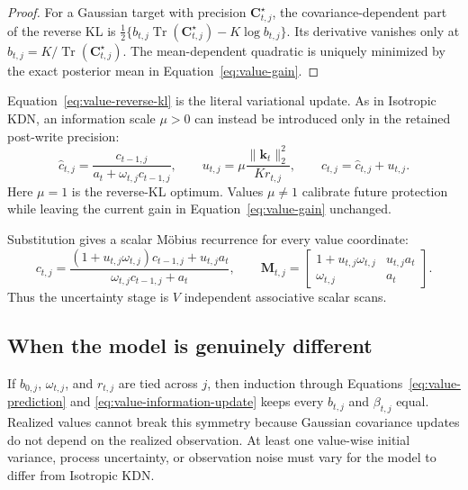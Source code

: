 \documentclass[11pt]{article}
\newcommand{\ve}[1]{\boldsymbol{#1}}
\newcommand{\Tr}{\operatorname{Tr}}
\begin{document}
\begin{proof}
For a Gaussian target with precision $\ve{C}_{t,j}^{\star}$, the covariance-dependent part of
the reverse KL is
$\tfrac12\{b_{t,j}\Tr(\ve{C}_{t,j}^{\star})-K\log b_{t,j}\}$.  Its derivative vanishes only at
$b_{t,j}=K/\Tr(\ve{C}_{t,j}^{\star})$.  The mean-dependent quadratic is uniquely minimized by
the exact posterior mean in Equation~\eqref{eq:value-gain}.
\end{proof}

Equation~\eqref{eq:value-reverse-kl} is the literal variational update.  As in Isotropic KDN, an
information scale $\mu>0$ can instead be introduced only in the retained post-write precision:
\begin{equation}
  \widehat c_{t,j}
  =\frac{c_{t-1,j}}{a_t+\omega_{t,j}c_{t-1,j}},
  \qquad
  u_{t,j}=\mu\frac{\|\ve{k}_t\|_2^2}{K r_{t,j}},
  \qquad
  c_{t,j}=\widehat c_{t,j}+u_{t,j}.
  \label{eq:value-information-update}
\end{equation}
Here $\mu=1$ is the reverse-KL optimum.  Values $\mu\ne1$ calibrate future protection while
leaving the current gain in Equation~\eqref{eq:value-gain} unchanged.

Substitution gives a scalar M\"obius recurrence for every value coordinate:
\begin{equation}
  c_{t,j}
  =\frac{(1+u_{t,j}\omega_{t,j})c_{t-1,j}+u_{t,j}a_t}
    {\omega_{t,j}c_{t-1,j}+a_t},
  \qquad
  \ve{M}_{t,j}
  =\begin{bmatrix}
    1+u_{t,j}\omega_{t,j} & u_{t,j}a_t\\
    \omega_{t,j} & a_t
  \end{bmatrix}.
  \label{eq:value-mobius}
\end{equation}
Thus the uncertainty stage is $V$ independent associative scalar scans.

\subsection{When the model is genuinely different}

If $b_{0,j}$, $\omega_{t,j}$, and $r_{t,j}$ are tied across $j$, then induction through
Equations~\eqref{eq:value-prediction} and \eqref{eq:value-information-update} keeps every
$b_{t,j}$ and $\beta_{t,j}$ equal.  Realized values cannot break this symmetry because Gaussian
covariance updates do not depend on the realized observation.  At least one value-wise initial
variance, process uncertainty, or observation noise must vary for the model to differ from
Isotropic KDN.
\end{document}
